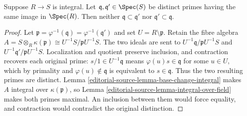 \begin{lemma}
\label{editorial-source-lemma-integral-no-inclusion}
Suppose $R \to S$ is integral.
Let $\mathfrak q, \mathfrak q' \in \Spec(S)$
be distinct primes
having the same image in $\Spec(R)$.
Then neither $\mathfrak q \subset \mathfrak q'$
nor $\mathfrak q' \subset \mathfrak q$.
\end{lemma}

\begin{proof}
Let $\mathfrak p=\varphi^{-1}(\mathfrak q)=
\varphi^{-1}(\mathfrak q')$ and set $U=R\setminus\mathfrak p$.
Retain the fibre algebra
$A=S\otimes_R\kappa(\mathfrak p)\cong U^{-1}S/\mathfrak pU^{-1}S$.
The two ideals are sent to
$U^{-1}\mathfrak q/\mathfrak pU^{-1}S$ and
$U^{-1}\mathfrak q'/\mathfrak pU^{-1}S$. Localization and quotient
preserve inclusion, and contraction recovers each original prime:
$s/1\in U^{-1}\mathfrak q$ means
$\varphi(u)s\in\mathfrak q$ for some $u\in U$, which by primality
and $\varphi(u)\notin\mathfrak q$ is equivalent to $s\in\mathfrak q$.
Thus the two resulting primes are distinct. Lemma
\ref{editorial-source-lemma-base-change-integral} makes $A$ integral over
$\kappa(\mathfrak p)$, so Lemma \ref{editorial-source-lemma-integral-over-field}
makes both primes maximal. An inclusion between them would force
equality, and contraction would contradict the original distinction.
\end{proof}